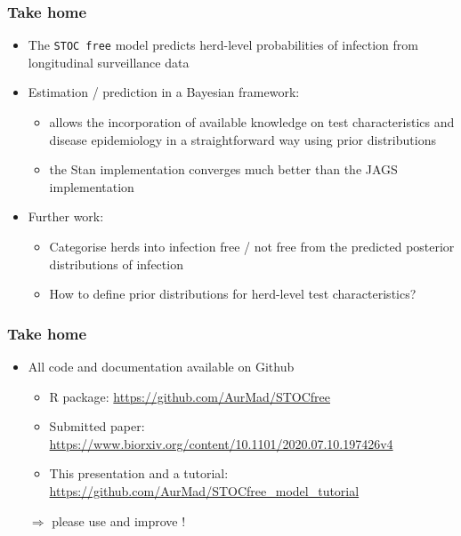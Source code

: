 \documentclass{beamer}
\begin{document}
\begin{frame}
\frametitle{Take home}
 \begin{itemize}
  \item{The \texttt{STOC free} model predicts herd-level probabilities of infection from longitudinal surveillance data}
  \item<2->{Estimation / prediction in a Bayesian framework:}
  \begin{itemize}
   \item{allows the incorporation of available knowledge on test characteristics and disease epidemiology in a straightforward way using prior distributions}
   \item{the Stan implementation converges much better than the JAGS implementation}
  \end{itemize}
  \item<3->{Further work:}
  \begin{itemize}
   \item{Categorise herds into infection free / not free from the predicted posterior distributions of infection}
   \item{How to define prior distributions for herd-level test characteristics?}
  \end{itemize}
 \end{itemize}
\end{frame}

\begin{frame}
\frametitle{Take home}
\begin{itemize}
  \item{All code and documentation available on Github}
  \begin{itemize}
   \item{R package: \url{https://github.com/AurMad/STOCfree}}
   \item{Submitted paper: \url{https://www.biorxiv.org/content/10.1101/2020.07.10.197426v4}}
   \item{This presentation and a tutorial: \url{https://github.com/AurMad/STOCfree_model_tutorial}}
  \end{itemize}
   \item[$\Rightarrow$]{please use and improve !}
 \end{itemize}
\end{frame}

{
    \begin{frame}[plain]
    \end{frame}
    }
\end{document}

